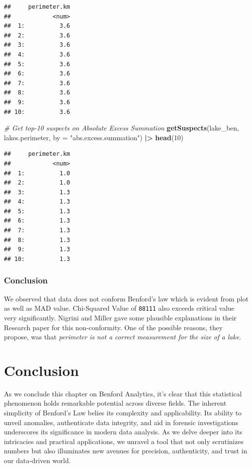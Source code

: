 \documentclass[
]{book}
\newenvironment{Shaded}{\begin{snugshade}}{\end{snugshade}}
\newcommand{\AttributeTok}[1]{\textcolor[rgb]{0.13,0.29,0.53}{#1}}
\newcommand{\CommentTok}[1]{\textcolor[rgb]{0.56,0.35,0.01}{\textit{#1}}}
\newcommand{\DecValTok}[1]{\textcolor[rgb]{0.00,0.00,0.81}{#1}}
\newcommand{\FunctionTok}[1]{\textcolor[rgb]{0.13,0.29,0.53}{\textbf{#1}}}
\newcommand{\NormalTok}[1]{#1}
\newcommand{\SpecialCharTok}[1]{\textcolor[rgb]{0.81,0.36,0.00}{\textbf{#1}}}
\newcommand{\StringTok}[1]{\textcolor[rgb]{0.31,0.60,0.02}{#1}}
\begin{document}
\begin{verbatim}
##     perimeter.km
##            <num>
##  1:          3.6
##  2:          3.6
##  3:          3.6
##  4:          3.6
##  5:          3.6
##  6:          3.6
##  7:          3.6
##  8:          3.6
##  9:          3.6
## 10:          3.6
\end{verbatim}

\begin{Shaded}
\begin{Highlighting}[]
\CommentTok{\# Get top{-}10 suspects on Absolute Excess Summation}
\FunctionTok{getSuspects}\NormalTok{(lake\_ben, lakes.perimeter, }
            \AttributeTok{by =} \StringTok{"abs.excess.summation"}\NormalTok{) }\SpecialCharTok{|\textgreater{}}
  \FunctionTok{head}\NormalTok{(}\DecValTok{10}\NormalTok{)}
\end{Highlighting}
\end{Shaded}

\begin{verbatim}
##     perimeter.km
##            <num>
##  1:          1.0
##  2:          1.0
##  3:          1.3
##  4:          1.3
##  5:          1.3
##  6:          1.3
##  7:          1.3
##  8:          1.3
##  9:          1.3
## 10:          1.3
\end{verbatim}

\hypertarget{conclusion-1}{%
\subsubsection*{Conclusion}\label{conclusion-1}}

We observed that data does not conform Benford's law which is evident from plot as well as MAD value. Chi-Squared Value of \texttt{88111} also exceeds critical value very significantly. Nigrini and Miller gave some plausible explanations in their Research paper \citep{article2007} for this non-conformity. One of the possible reasons, they propose, was that \emph{perimeter is not a correct measurement for the size of a lake.}

\hypertarget{conclusion-2}{%
\section{Conclusion}\label{conclusion-2}}

As we conclude this chapter on Benford Analytics, it's clear that this statistical phenomenon holds remarkable potential across diverse fields. The inherent simplicity of Benford's Law belies its complexity and applicability. Its ability to unveil anomalies, authenticate data integrity, and aid in forensic investigations underscores its significance in modern data analysis. As we delve deeper into its intricacies and practical applications, we unravel a tool that not only scrutinizes numbers but also illuminates new avenues for precision, authenticity, and trust in our data-driven world.
\end{document}
